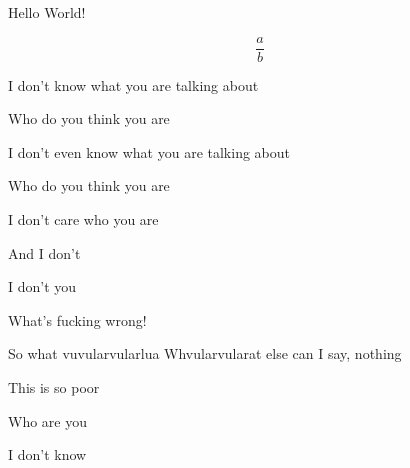 \documentclass{article}
\begin{document}
Hello World!

$$
\frac{a}{b}
$$

I don't know what you are talking about

Who do you think you are

I don't even know what you are talking about

Who do you think you are

I don't care who you are

And I don't 

\huge I don't you

What's fucking wrong!

So what
vuvularvularlua
Whvularvularat else can I say, nothing

This is so poor

Who are you

I don't know

 
\end{document}
